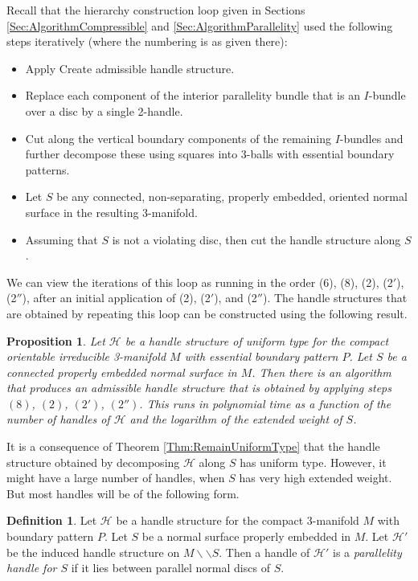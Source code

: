 \documentclass[oneside]{amsart}
\numberwithin{equation}{section}
\theoremstyle{plain}
\newtheorem{proposition}[equation]{Proposition}
\theoremstyle{definition}
\newtheorem{definition}[equation]{Definition}
\newcommand{\cut}{\backslash\backslash}
\newcommand{\calH}{\mathcal{H}}
\begin{document}
Recall that the hierarchy construction loop given in Sections \ref{Sec:AlgorithmCompressible} and \ref{Sec:AlgorithmParallelity} used the following steps iteratively (where the numbering is as
given there):
\begin{itemize}
\item[(2)] Apply {\sc Create admissible handle structure}.
\item[(2$'$)] Replace each component of the interior parallelity bundle that is an $I$-bundle over a disc by a single 2-handle.
\item[(2$''$)] Cut along the vertical boundary components of the remaining $I$-bundles and
further decompose these using squares into 3-balls with essential boundary
patterns.
\item[(6)] Let $S$ be any connected, non-separating, properly embedded, oriented normal surface in the resulting 3-manifold. 
\item[(8)] Assuming that $S$ is not a violating disc, then cut the handle structure along $S$.
\end{itemize}

We can view the iterations of this loop as running in the order (6), (8), (2), (2$'$), (2$''$),
after an initial application of (2), (2$'$), and (2$''$).
The handle structures that are obtained by repeating this loop can be constructed
using the following result.

\begin{proposition}
\label{Prop:DecomposePolyTime}
Let $\calH$ be a handle structure of uniform type for the compact orientable irreducible 3-manifold $M$ with essential boundary pattern $P$. 
Let $S$ be a connected properly embedded
normal surface in $M$. Then there is an algorithm that produces an admissible handle structure 
that is obtained by applying steps $(8)$, $(2)$, $(2')$, $(2'')$. This runs in polynomial time as a function of
the number of handles of $\calH$ and the logarithm of the extended weight of $S$.
\end{proposition}

It is a consequence of Theorem \ref{Thm:RemainUniformType} that the handle structure obtained by decomposing $\calH$ along $S$
has uniform type. However, it might have a large number of handles, when $S$ has very high extended weight.
But most handles will be of the following form.

\begin{definition} 
Let $\calH$ be a handle structure for the compact 3-manifold $M$ with boundary pattern $P$.
Let $S$ be a normal surface properly embedded in $M$. Let $\calH'$ be the induced handle
structure on $M \cut S$. Then a handle of $\calH'$ is a \emph{parallelity handle for $S$}
if it lies between parallel normal discs of $S$.
\end{definition}
\end{document}
